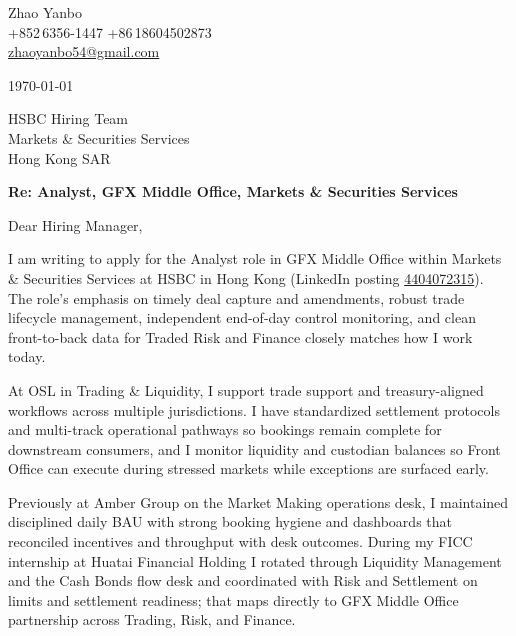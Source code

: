 \documentclass[10pt,a4paper]{article}
\begin{document}
\begin{flushleft}
  Zhao Yanbo\\
  +852\,6356-1447 \;\textbar\; +86\,18604502873\\
  \href{mailto:zhaoyanbo54@gmail.com}{zhaoyanbo54@gmail.com}
\end{flushleft}

\vspace{1em}

\begin{flushright}
  \today
\end{flushright}

\vspace{0.75em}

HSBC Hiring Team\\
Markets \& Securities Services\\
Hong Kong SAR

\vspace{1em}

\textbf{Re: Analyst, GFX Middle Office, Markets \& Securities Services}

\vspace{0.75em}

Dear Hiring Manager,

I am writing to apply for the Analyst role in GFX Middle Office within Markets \& Securities Services at HSBC in Hong Kong (LinkedIn posting \href{https://www.linkedin.com/jobs/view/4404072315/}{4404072315}). The role's emphasis on timely deal capture and amendments, robust trade lifecycle management, independent end-of-day control monitoring, and clean front-to-back data for Traded Risk and Finance closely matches how I work today.

At OSL in Trading \& Liquidity, I support trade support and treasury-aligned workflows across multiple jurisdictions. I have standardized settlement protocols and multi-track operational pathways so bookings remain complete for downstream consumers, and I monitor liquidity and custodian balances so Front Office can execute during stressed markets while exceptions are surfaced early.

Previously at Amber Group on the Market Making operations desk, I maintained disciplined daily BAU with strong booking hygiene and dashboards that reconciled incentives and throughput with desk outcomes. During my FICC internship at Huatai Financial Holding I rotated through Liquidity Management and the Cash Bonds flow desk and coordinated with Risk and Settlement on limits and settlement readiness; that maps directly to GFX Middle Office partnership across Trading, Risk, and Finance.
\end{document}
